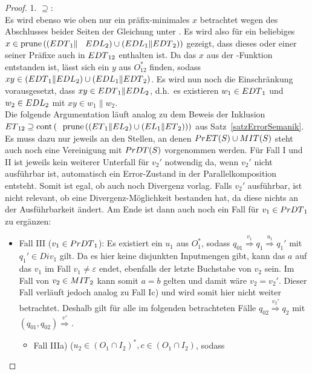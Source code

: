 \begin{proof}
  1. \glqq{}$\supseteq$\grqq{}:\\
  Es wird ebenso wie oben nur ein präfix-minimales $x$ betrachtet wegen des
  Abschlusses beider Seiten der Gleichung unter \cont{}. Es wird also für ein
  beliebiges $x\in\mathrm{prune}{}\left(\left(EDT{}_1\|\right.\right.$
  $\left.\left.EDL{}_2\right)\cup \left(EDL{}_1\|EDT{}_2\right)\right)$ gezeigt, dass
  dieses oder einer seiner Präfixe auch in $EDT{}_{12}$ enthalten ist. Da das
  $x$ aus der \prune{}-Funktion entstanden ist, lässt sich ein $y$ aus
  $O_{12}^*$ finden, sodass $xy\in (EDT{}_1\|EDL{}_2)\cup
  (EDL{}_1\|EDT{}_2)$. Es wird nun noch die Einschränkung vorausgesetzt,
  dass \oBdA{} $xy\in EDT{}_1\|EDL{}_2$, d.h.\ es existieren
  $w_1\in EDT{}_1$ und $w_2\in EDL{}_2$ mit $xy\in w_1\|w_2$.\\
  Die folgende Argumentation läuft analog zu dem Beweis der Inklusion
  $ET{}_{12} \supseteq \mathrm{cont}{}\left(\right.$ $\left.\mathrm{prune}{}\left(\left(ET{}_1\|EL_2\right)\cup
  \left(EL{}_1\|ET{}_2\right)\right)\right)$ aus Satz~\ref{satzErrorSemanik}. Es muss dazu nur
  jeweils an den Stellen, an denen $PrET{}(S)\cup MIT{}(S)$ steht auch noch eine
  Vereinigung mit $PrDT{}(S)$ vorgenommen werden. Für Fall I und II ist
  jeweils kein weiterer Unterfall für $v_2'$ notwendig da, wenn $v_2'$ nicht
  ausführbar ist, automatisch ein Error-Zustand in der Parallelkomposition entsteht.
  Somit ist egal, ob auch noch Divergenz vorlag. Falls $v_2'$ ausführbar, ist
  nicht relevant, ob eine Divergenz-Möglichkeit bestanden hat, da diese
  nichts an der Ausführbarkeit ändert. Am Ende ist dann auch noch ein Fall für
  $v_1\in PrDT{}_1$ zu ergänzen:
  \begin{itemize}
    \item Fall III ($v_1\in PrDT{}_1$): Es existiert ein $u_1$ aus $O_1^*$,
      sodass $q_{01} \overset{v_1}{\Rightarrow} q_1 \overset{u_1}{\Rightarrow}
      q_1'$ mit $q_1'\in Div_1$ gilt. Da es hier keine disjunkten Inputmengen gibt, kann das
      $a$ auf das $v_1$ im Fall $v_1\neq \varepsilon$ endet, ebenfalls der
      letzte Buchstabe von $v_2$ sein. Im Fall von $v_2\in MIT{}_2$ kann somit
      $a=b$ gelten und damit wäre $v_2= v_2'$. Dieser Fall verläuft jedoch
      analog zu Fall Ic) und wird somit hier nicht weiter betrachtet. Deshalb
      gilt für alle im folgenden betrachteten Fälle $q_{02} \overset{v_2'}{\Rightarrow}
      q_2$ mit $(q_{01},q_{02}) \overset{v'}{\Rightarrow}$.
      \begin{itemize}
        \item Fall IIIa) \Big($u_2\in (O_1\cap I_2)^*, c\in (O_1\cap I_2)$, sodass

\end{itemize}
\end{itemize}
\end{proof}
